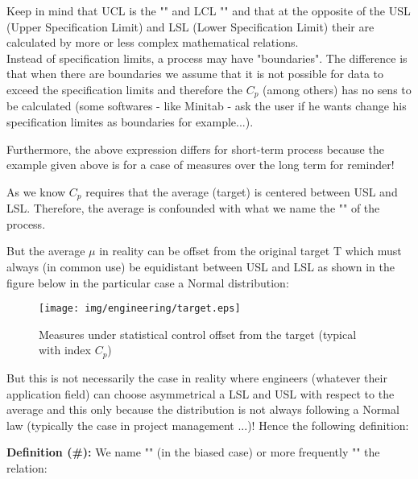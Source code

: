 	\begin{tcolorbox}[title=Remark,colframe=black,arc=10pt]
	Keep in mind that UCL is the "" and LCL "" and that at the opposite of the USL (Upper Specification Limit) and LSL (Lower Specification Limit) their are calculated by more or less complex mathematical relations.\\
	
	Instead of specification limits, a process may have "boundaries". The difference is that when there are boundaries we assume that it is not possible for data to exceed the specification limits and therefore the $C_p$ (among others) has no sens to be calculated (some softwares - like Minitab - ask the user if he wants change his specification limites as boundaries for example...).
	\end{tcolorbox}

Furthermore, the above expression differs for short-term process because the example given above is for a case of measures over the long term for reminder!

As we know $C_p$ requires that the average (target) is centered between USL and LSL. Therefore, the average is confounded with what we name the "" of the process.

But the average $\mu$ in reality can be offset from the original target T which must always (in common use) be equidistant between USL and LSL as shown in the figure below in the particular case a Normal distribution:

		\begin{figure}[H]
		\centering
		\texttt{[image: img/engineering/target.eps]}
		\caption{Measures under statistical control offset from the target (typical with index $C_p$)}
		\end{figure}

But this is not necessarily the case in reality where engineers (whatever their application field) can choose asymmetrical a LSL and USL with respect to the average and this only because the distribution is not always following a Normal law (typically the case in project management ...)! Hence the following definition:

\textbf{Definition (\#\mydef):} We name "" (in the biased case) or more frequently "" the relation:
	
